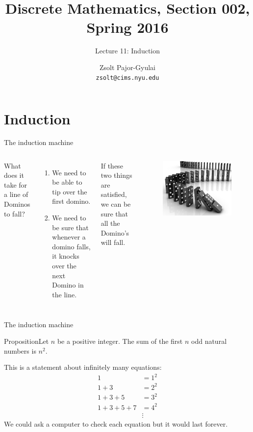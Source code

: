 \documentclass{beamer}
\title{Discrete Mathematics, Section 002, Spring 2016}
\subtitle{Lecture 11: Induction}
\author[Zsolt]{Zsolt Pajor-Gyulai \\ \texttt{zsolt@cims.nyu.edu}}
\institute[NYU] 
{
\normalsize Courant Institute of Mathematical Sciences
}
\def\bl[#1]#2{\begin{block}{#1}#2\end{block}}
\def\enumb{\begin{enumerate}}
\def\enume{\end{enumerate}}
\begin{document}
\begin{frame}
  \titlepage
\end{frame}


\section{Induction}

\begin{frame}{The induction machine}
\begin{columns}
What does it take for a line of Dominos to fall?
\enumb
\item We need to be able to tip over the first domino.
\item We need to be sure that whenever a domino falls, it knocks over the next Domino in the line.
\enume
If these two things are satisfied, we can be sure that all the Domino's will fall.
\begin{figure}
\centering
\includegraphics[scale=0.1]{dominos}
\end{figure}
\end{columns}
\end{frame}

\begin{frame}{The induction machine}
\bl[Proposition]{Let $n$ be a positive integer. The sum of the first $n$ odd natural numbers is $n^2$.}
This is a statement about infinitely many equations:
\begin{align*}
1&=1^2\\
1+3&=2^2\\
1+3+5&=3^2\\
1+3+5+7&=4^2\\
&\vdots
\end{align*}
We could ask a computer to check each equation but it would last forever.
\end{frame}
\end{document}
